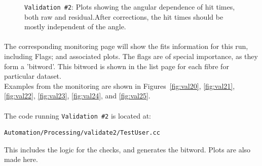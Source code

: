 \documentclass[12pt]{article}
\begin{document}
\begin{figure}
\centering
\noindent{}
  \caption{\centering \texttt{Validation \#2}: Plots showing the angular dependence of hit times, both raw and residual.\hspace{\textwidth}After corrections, the hit times should be mostly independent of the angle. }
  \label{fig:val26}
\end{figure}

\paragraph{}
The corresponding monitoring page will show the fits information for this run, including Flags; and associated plots. The flags are of special importance, as they form a 'bitword'. This bitword is shown in the list page for each fibre for particular dataset.\\
Examples from the monitoring are shown in Figures~\ref{fig:val20}, \ref{fig:val21}, \ref{fig:val22}, \ref{fig:val23}, \ref{fig:val24}, and \ref{fig:val25}.

\paragraph{}
The code running \texttt{Validation \#2} is located at:
\begin{lstlisting}
Automation/Processing/validate2/TestUser.cc
\end{lstlisting}
This includes the logic for the checks, and generates the bitword. Plots are also made here.
\end{document}
